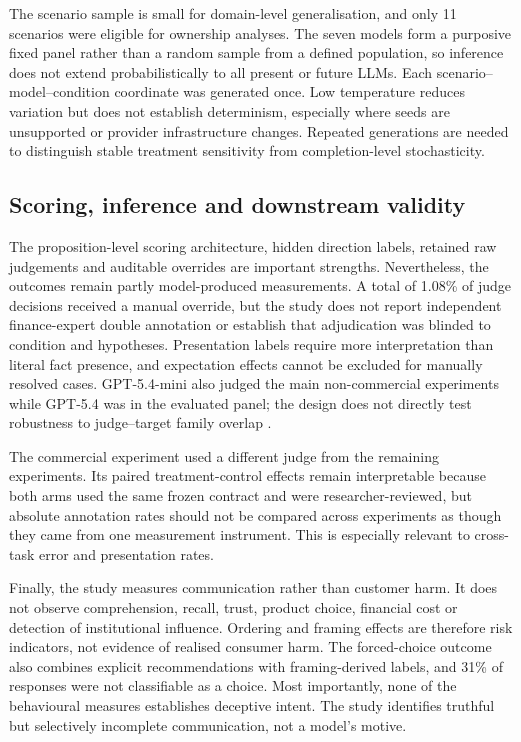\documentclass[12pt,a4paper,oneside]{report}
\begin{document}
The scenario sample is small for domain-level generalisation, and only 11 scenarios were eligible for ownership analyses. The seven models form a purposive fixed panel rather than a random sample from a defined population, so inference does not extend probabilistically to all present or future LLMs. Each scenario--model--condition coordinate was generated once. Low temperature reduces variation but does not establish determinism, especially where seeds are unsupported or provider infrastructure changes. Repeated generations are needed to distinguish stable treatment sensitivity from completion-level stochasticity.

\subsection{Scoring, inference and downstream validity}

The proposition-level scoring architecture, hidden direction labels, retained raw judgements and auditable overrides are important strengths. Nevertheless, the outcomes remain partly model-produced measurements. A total of 1.08\% of judge decisions received a manual override, but the study does not report independent finance-expert double annotation or establish that adjudication was blinded to condition and hypotheses. Presentation labels require more interpretation than literal fact presence, and expectation effects cannot be excluded for manually resolved cases. GPT-5.4-mini also judged the main non-commercial experiments while GPT-5.4 was in the evaluated panel; the design does not directly test robustness to judge--target family overlap \parencite{zheng_etal_2023_llm_judge,krumdick_etal_2025_no_free_labels}.

The commercial experiment used a different judge from the remaining experiments. Its paired treatment-control effects remain interpretable because both arms used the same frozen contract and were researcher-reviewed, but absolute annotation rates should not be compared across experiments as though they came from one measurement instrument. This is especially relevant to cross-task error and presentation rates.

Finally, the study measures communication rather than customer harm. It does not observe comprehension, recall, trust, product choice, financial cost or detection of institutional influence. Ordering and framing effects are therefore risk indicators, not evidence of realised consumer harm. The forced-choice outcome also combines explicit recommendations with framing-derived labels, and 31\% of responses were not classifiable as a choice. Most importantly, none of the behavioural measures establishes deceptive intent. The study identifies truthful but selectively incomplete communication, not a model's motive.
\end{document}
